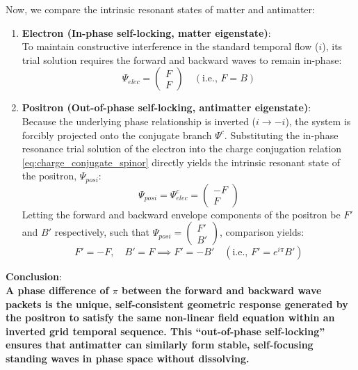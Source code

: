 \documentclass[12pt, a4paper]{article}
\begin{document}
Now, we compare the intrinsic resonant states of matter and antimatter:
\begin{enumerate}
    \item \textbf{Electron (In-phase self-locking, matter eigenstate)}: \\
    To maintain constructive interference in the standard temporal flow ($i$), its trial solution requires the forward and backward waves to remain in-phase:
    \begin{equation}
        \Psi_{elec} = \begin{pmatrix} F \\ F \end{pmatrix} \quad (\text{i.e., } F = B) 
    \end{equation}
    \item \textbf{Positron (Out-of-phase self-locking, antimatter eigenstate)}: \\
    Because the underlying phase relationship is inverted ($i \to -i$), the system is forcibly projected onto the conjugate branch $\Psi^c$. Substituting the in-phase resonance trial solution of the electron into the charge conjugation relation \eqref{eq:charge_conjugate_spinor} directly yields the intrinsic resonant state of the positron, $\Psi_{posi}$:
    \begin{equation}
        \Psi_{posi} = \Psi_{elec}^c = \begin{pmatrix} -F \\ F \end{pmatrix} 
    \end{equation}
    Letting the forward and backward envelope components of the positron be $F'$ and $B'$ respectively, such that $\Psi_{posi} = \begin{pmatrix} F' \\ B' \end{pmatrix}$, comparison yields:
    \begin{equation}
        F' = -F, \quad B' = F \implies F' = -B' \quad (\text{i.e., } F' = e^{i\pi} B') 
    \end{equation}
\end{enumerate}

\textbf{Conclusion}: \\
\textbf{A phase difference of $\pi$ between the forward and backward wave packets is the unique, self-consistent geometric response generated by the positron to satisfy the same non-linear field equation within an inverted grid temporal sequence. This ``out-of-phase self-locking'' ensures that antimatter can similarly form stable, self-focusing standing waves in phase space without dissolving.}
\end{document}
